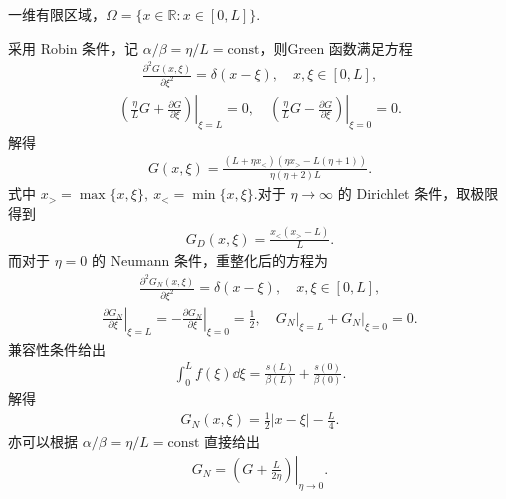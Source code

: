 \begin{exbox}
	一维有限区域，\(\Omega=\{x\in\mathbb{R}:x\in[0,L]\}\).
	
	采用 Robin 条件，记 \(\alpha/\beta=\eta/L=\mathrm{const}\)，则Green 函数满足方程
	\begin{align*}
		\frac{\partial^2G(x,\xi)}{\partial\xi^2}=\delta(x-\xi),\quad x,\xi\in[0,L],
	\end{align*}
	\begin{align*}
		\left.\left(\frac{\eta}{L}G+\frac{\partial G}{\partial\xi}\right)\right|_{\xi=L}=0,
		\quad
		\left.\left(\frac{\eta}{L}G-\frac{\partial G}{\partial\xi}\right)\right|_{\xi=0}=0.
	\end{align*}
	解得
	\begin{align*}
		G(x,\xi)=\frac{(L+\eta x_<)(\eta x_>-L(\eta+1))}{\eta(\eta+2)L}.
	\end{align*}
	式中 \(x_>=\max\{x,\xi\},\ x_<=\min\{x,\xi\}\).对于 \(\eta\to\infty\) 的 Dirichlet 条件，取极限得到
	\begin{align*}
		G_D(x,\xi)=\frac{x_<(x_>-L)}{L}.
	\end{align*}
	而对于 \(\eta=0\) 的 Neumann 条件，重整化后的方程为
	\begin{align*}
		\frac{\partial^2G_N(x,\xi)}{\partial\xi^2}=\delta(x-\xi),\quad x,\xi\in[0,L],
	\end{align*}
	\begin{align*}
		\left.\frac{\partial G_N}{\partial\xi}\right|_{\xi=L}
		=-\left.\frac{\partial G_N}{\partial\xi}\right|_{\xi=0}
		=\frac{1}{2},\quad
		\left.G_N\right|_{\xi=L}+\left.G_N\right|_{\xi=0}=0.
	\end{align*}
	兼容性条件给出
	\begin{align*}
		\int_0^L f(\xi)\dd\xi=\frac{s(L)}{\beta(L)}+\frac{s(0)}{\beta(0)}.
	\end{align*}
	解得
	\begin{align*}
		G_N(x,\xi)=\frac{1}{2}\left|x-\xi\right|-\frac{L}{4}.
	\end{align*}
	亦可以根据 \(\alpha/\beta=\eta/L=\mathrm{const}\) 直接给出
	\begin{align*}
		G_N=\left.\left(G+\frac{L}{2\eta}\right)\right|_{\eta\to0}.
	\end{align*}
\end{exbox}

